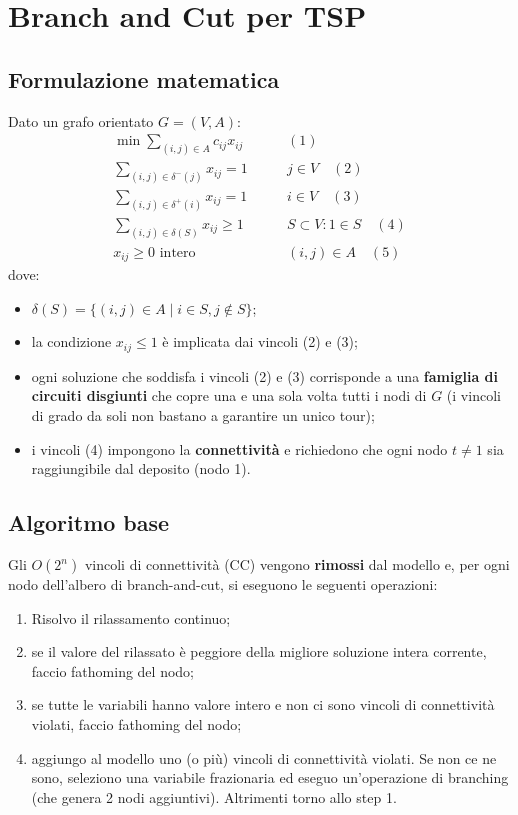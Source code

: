 \section{Branch and Cut per TSP}
\subsection{Formulazione matematica}
Dato un grafo orientato $G=(V,A)$:
\begin{equation*}
	\begin{aligned}
		\min \sum_{(i,j)\in A}c_{ij}x_{ij} \quad & \quad (1)\\
		\sum_{(i,j)\in \delta^-(j)}x_{ij}=1 \quad & \quad j\in V \quad (2)\\
		\sum_{(i,j)\in \delta^+(i)}x_{ij}=1 \quad & \quad i\in V \quad (3)\\
		\sum_{(i,j)\in \delta(S)}x_{ij}\ge 1 \quad & \quad S\subset V:1\in S \quad (4)\\
		x_{ij}\ge 0 \textrm{ intero} \quad & \quad (i,j)\in A \quad (5)
	\end{aligned}
\end{equation*}
dove:
\begin{itemize}
	\item $\delta (S)=\{(i,j)\in A\mid i \in S, j\notin S\}$;
	\item la condizione $x_{ij}\le 1$ è implicata dai vincoli (2) e (3);
	\item ogni soluzione che soddisfa i vincoli (2) e (3) corrisponde a una \textbf{famiglia di circuiti disgiunti} che copre una e una sola volta tutti i nodi di $G$ (i vincoli di grado da soli non bastano a garantire un unico tour);
	\item i vincoli (4) impongono la \textbf{connettività} e richiedono che ogni nodo $t\neq 1$ sia raggiungibile dal deposito (nodo 1).
\end{itemize}

\subsection{Algoritmo base}
Gli $O(2^n)$ vincoli di connettività (CC) vengono \textbf{rimossi} dal modello e, per ogni nodo dell'albero di branch-and-cut, si eseguono le seguenti operazioni:
\begin{enumerate}
	\item Risolvo il rilassamento continuo;
	\item se il valore del rilassato è peggiore della migliore soluzione intera corrente, faccio fathoming del nodo;
	\item se tutte le variabili hanno valore intero e non ci sono vincoli di connettività violati, faccio fathoming del nodo;
	\item aggiungo al modello uno (o più) vincoli di connettività violati. Se non ce ne sono, seleziono una variabile frazionaria ed eseguo un'operazione di branching (che genera 2 nodi aggiuntivi). Altrimenti torno allo step 1.
\end{enumerate}

